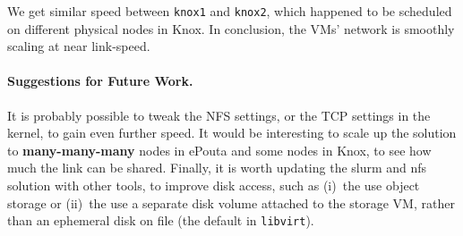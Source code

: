 We get similar speed between \texttt{knox1} and \texttt{knox2}, which
happened to be scheduled on different physical nodes in Knox.
%
In conclusion, the VMs' network is smoothly scaling at near
link-speed.


\paragraph{Suggestions for Future Work.}%
\label{section:suggestions:future:work}
%
It is probably possible to tweak the NFS settings, or the TCP settings
in the kernel, to gain even further speed.
%
It would be interesting to scale up the solution to
\textbf{many-many-many} nodes in ePouta and some nodes in Knox, to see
how much the link can be shared.
%
Finally, it is worth updating the slurm and nfs solution with other
tools, to improve disk access, such as (i)~the use object storage or
(ii)~the use a separate disk volume attached to the storage VM, rather
than an ephemeral disk on file (\ie the default in \texttt{libvirt}).

